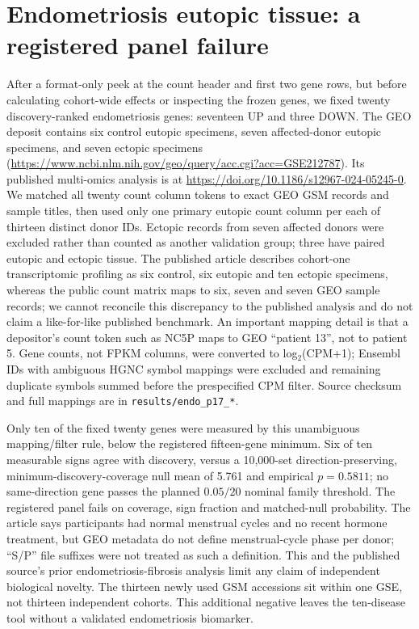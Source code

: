 \documentclass[11pt,a4paper]{article}
\begin{document}
\section{Endometriosis eutopic tissue: a registered panel failure}
After a format-only peek at the count header and first two gene rows, but before calculating cohort-wide effects or inspecting the frozen genes, we fixed twenty discovery-ranked endometriosis genes: seventeen UP and three DOWN. The GEO deposit contains six control eutopic specimens, seven affected-donor eutopic specimens, and seven ectopic specimens (\url{https://www.ncbi.nlm.nih.gov/geo/query/acc.cgi?acc=GSE212787}). Its published multi-omics analysis is at \url{https://doi.org/10.1186/s12967-024-05245-0}. We matched all twenty count column tokens to exact GEO GSM records and sample titles, then used only one primary eutopic count column per each of thirteen distinct donor IDs. Ectopic records from seven affected donors were excluded rather than counted as another validation group; three have paired eutopic and ectopic tissue. The published article describes cohort-one transcriptomic profiling as six control, six eutopic and ten ectopic specimens, whereas the public count matrix maps to six, seven and seven GEO sample records; we cannot reconcile this discrepancy to the published analysis and do not claim a like-for-like published benchmark. An important mapping detail is that a depositor's count token such as NC5P maps to GEO ``patient 13'', not to patient 5. Gene counts, not FPKM columns, were converted to log$_2$(CPM+1); Ensembl IDs with ambiguous HGNC symbol mappings were excluded and remaining duplicate symbols summed before the prespecified CPM filter. Source checksum and full mappings are in \texttt{results/endo\_p17\_*}.

Only ten of the fixed twenty genes were measured by this unambiguous mapping/filter rule, below the registered fifteen-gene minimum. Six of ten measurable signs agree with discovery, versus a 10,000-set direction-preserving, minimum-discovery-coverage null mean of 5.761 and empirical $p=0.5811$; no same-direction gene passes the planned $0.05/20$ nominal family threshold. The registered panel fails on coverage, sign fraction and matched-null probability. The article says participants had normal menstrual cycles and no recent hormone treatment, but GEO metadata do not define menstrual-cycle phase per donor; ``S/P'' file suffixes were not treated as such a definition. This and the published source's prior endometriosis-fibrosis analysis limit any claim of independent biological novelty. The thirteen newly used GSM accessions sit within one GSE, not thirteen independent cohorts. This additional negative leaves the ten-disease tool without a validated endometriosis biomarker.
\end{document}
